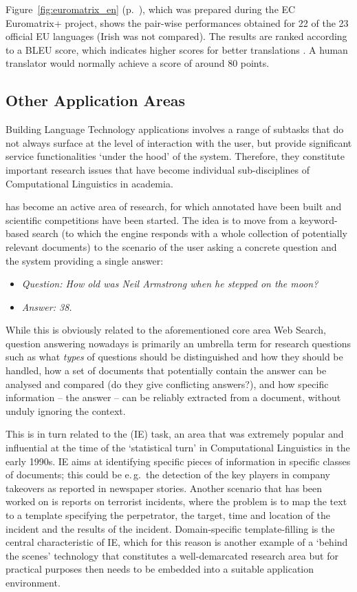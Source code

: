 \begin{multicols}{2}
Figure~\ref{fig:euromatrix_en} (p.~\pageref{fig:euromatrix_en}), which was prepared during the EC Euromatrix+ project, shows the pair-wise performances obtained for 22 of the 23 official EU languages (Irish was not compared). The results are ranked according to a BLEU score, which indicates higher scores for better translations \cite{bleu1}. A human translator would normally achieve a score of around 80 points.

\subsection{Other Application Areas}
Building Language Technology applications involves a range of subtasks that do not always surface at the level of interaction with the user, but provide significant service functionalities ‘under the hood’ of the system. Therefore, they constitute important research issues that have become individual sub-disciplines of Computational Linguistics in academia. 

 has become an active area of research, for which annotated  have been built and scientific competitions have been started. The idea is to move from a keyword-based search (to which the engine responds with a whole collection of potentially relevant documents) to the scenario of the user asking a concrete question and the system providing a single answer:
\begin{itemize}
	\item[] \textit{Question: How old was Neil Armstrong when he stepped on the moon?}
	\item[] \textit{Answer: 38.}
\end{itemize}
While this is obviously related to the aforementioned core area Web Search, question answering nowadays is primarily an umbrella term for research questions such as what \emph{types} of questions should be distinguished and how they should be handled, how a set of documents that potentially contain the answer can be analysed and compared (do they give conflicting answers?), and how specific information – the answer – can be reliably extracted from a document, without unduly ignoring the context. 

This is in turn related to the  (IE) task, an area that was extremely popular and influential at the time of the ‘statistical turn’ in Computational Linguistics in the early 1990s. IE aims at identifying specific pieces of information in specific classes of documents; this could be e.\,g.~the detection of the key players in company takeovers as reported in newspaper stories. Another scenario that has been worked on is reports on terrorist incidents, where the problem is to map the text to a template specifying the perpetrator, the target, time and location of the incident and the results of the incident. Domain-specific template-filling is the central characteristic of IE, which for this reason is another example of a ‘behind the scenes’ technology that constitutes a well-demarcated research area but for practical purposes then needs to be embedded into a suitable application environment. 


\end{multicols}
